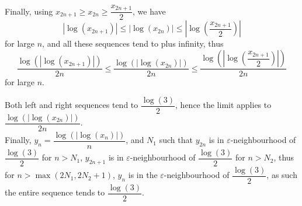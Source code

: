 \documentclass[11pt, a4paper, oneside]{article}
\theoremstyle{remark}
\theoremstyle{lemma}
\begin{document}
Finally, using \( x_{2n+1} \geq x_{2n} \geq \dfrac{x_{2n+1}}{2} \), we have 
\[
\left| \log(x_{2n+1}) \right| \leq \left| \log(x_{2n}) \right| \leq \left| \log\left( \dfrac{x_{2n+1}}{2} \right) \right|
\]
for large \( n \), and all these sequences tend to plus infinity, thus
\[
\dfrac{\log\left( \left| \log(x_{2n+1}) \right| \right)}{2n} \leq \dfrac{\log\left( \left| \log(x_{2n}) \right| \right)}{2n} \leq \dfrac{\log\left( \left| \log\left( \dfrac{x_{2n+1}}{2} \right) \right| \right)}{2n}
\]
for large \( n \).

Both left and right sequences tend to \( \dfrac{\log(3)}{2} \), hence the limit applies to \( \dfrac{\log\left( \left| \log(x_{2n}) \right| \right)}{2n} \).\\

Finally, \( y_n = \dfrac{\log\left( \left| \log(x_n) \right| \right)}{n} \), and \( N_1 \) such that \( y_{2n} \) is in \( \varepsilon \)-neighbourhood of \( \dfrac{\log(3)}{2} \) for \( n > N_1 \), \( y_{2n+1} \) is in \( \varepsilon \)-neighbourhood of \( \dfrac{\log(3)}{2} \) for \( n > N_2 \), thus for \( n > \max(2N_1, 2N_2 + 1) \), \( y_n \) is in the \( \varepsilon \)-neighbourhood of \( \dfrac{\log(3)}{2} \), as such the entire sequence tends to \( \dfrac{\log(3)}{2} \).
\end{document}
